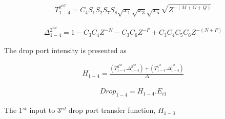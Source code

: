 \documentclass{osa-article}
\begin{document}
\begin{equation}
\begin{split}
T^{2^{nd}}_{1-4}=C_4S_1S_2S_7S_8\sqrt{x_1}\sqrt{x_3}\sqrt{x_5}\sqrt{Z^{-(M+O+Q)}}
\end{split}
\end{equation}

\begin{equation}
\begin{split}
\Delta^{2^{nd}}_{1-4}=1-C_3C_4Z^{-N}-C_3C_6Z^{-P}+C_3C_4C_5C_6Z^{-(N+P)}
\end{split}
\end{equation}

The drop port intensity is presented as

\begin{equation}
\begin{split}
H_{1-4}=\frac{(T^{2^{nd}}_{1-4}.\Delta^{2^{nd}}_{1-4})+(T^{1^{st}}_{1-4}.\Delta^{1^{st}}_{1-4})}{\Delta}
\end{split}
\end{equation}

\begin{equation}
\begin{split}
Drop_{1-4}=H_{1-4}.E_{i1}
\end{split}
\end{equation}

The 1$^{st}$ input to 3$^{rd}$ drop port transfer function, $H_{1-3}$\\
\end{document}
